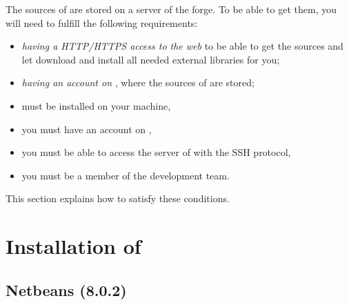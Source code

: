 The sources of \Simol are stored on a server of the \SourceSup forge. To be able to get them, you will need to fulfill the following requirements:
\begin{itemize}
\item \textit{having a HTTP/HTTPS access to the web} to be able to get the sources and let \Simol download and install all needed external libraries for you; 
\item \textit{having an account on \SourceSup}, where the sources of \Simol are stored;
\item \Git must be installed on your machine,
\item you must have an account on \SourceSup,
\item you must be able to access the server of \SourceSup with the SSH protocol,
\item you must be a member of the \Simol development team.
\end{itemize}
This section explains how to satisfy these conditions.




\section{Installation of \Simol}









\subsection{Netbeans (8.0.2)}

